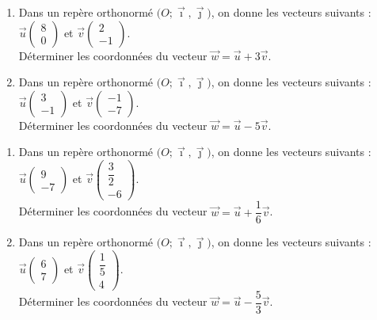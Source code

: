 \documentclass[11pt]{article}
\begin{document}
\begin{exercice}[1]

\begin{enumerate}[itemsep=1em]
\item Dans un repère orthonormé $\big(O ; \vec \imath,\vec \jmath\big)$, on donne les vecteurs suivants : $\vec{u}\begin{pmatrix}8\\0\end{pmatrix}$ et $\vec{v}\begin{pmatrix}2\\-1\end{pmatrix}$.\\Déterminer les coordonnées du vecteur $\overrightarrow{w}=\overrightarrow{u}+3\overrightarrow{v}$.
\item Dans un repère orthonormé $\big(O ; \vec \imath,\vec \jmath\big)$, on donne les vecteurs suivants : $\vec{u}\begin{pmatrix}3\\-1\end{pmatrix}$ et $\vec{v}\begin{pmatrix}-1\\-7\end{pmatrix}$.\\Déterminer les coordonnées du vecteur $\overrightarrow{w}=\overrightarrow{u}-5\overrightarrow{v}$.
\end{enumerate}
\end{exercice}

\begin{exercice}[1]

\begin{enumerate}[itemsep=1em]
\item Dans un repère orthonormé $\big(O ; \vec \imath,\vec \jmath\big)$, on donne les vecteurs suivants : $\vec{u}\begin{pmatrix}9\\[0.7em]-7\end{pmatrix}$ et $\vec{v}\begin{pmatrix}\dfrac{3}{2}\\[0.7em]-6\end{pmatrix}$.\\Déterminer les coordonnées du vecteur $\overrightarrow{w}=\overrightarrow{u}+\dfrac{1}{6}\overrightarrow{v}$.
\item Dans un repère orthonormé $\big(O ; \vec \imath,\vec \jmath\big)$, on donne les vecteurs suivants : $\vec{u}\begin{pmatrix}6\\[0.7em]7\end{pmatrix}$ et $\vec{v}\begin{pmatrix}\dfrac{1}{5}\\[0.7em]4\end{pmatrix}$.\\Déterminer les coordonnées du vecteur $\overrightarrow{w}=\overrightarrow{u}-\dfrac{5}{3}\overrightarrow{v}$.
\end{enumerate}
\end{exercice}
\end{document}
